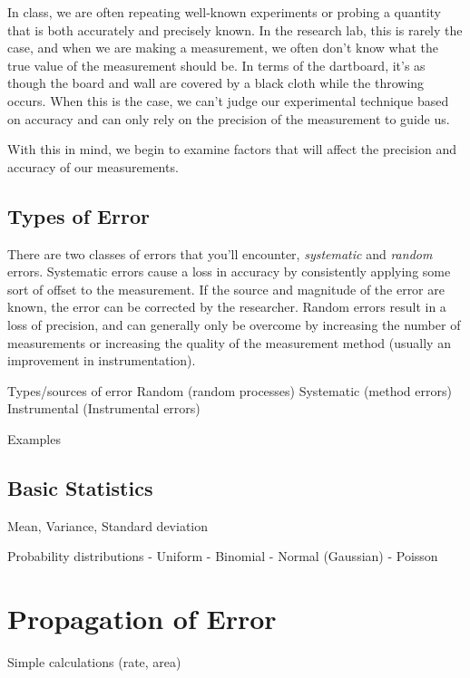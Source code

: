 \documentclass[nobib,nofonts,nols,nohyper]{tufte-handout}
\begin{document}
In class, we are often repeating well-known experiments or probing a quantity that is both accurately and precisely known. 
In the research lab, this is rarely the case, and when we are making a measurement, we often don't know what the true value of the measurement should be. 
In terms of the dartboard, it's as though the board and wall are covered by a black cloth while the throwing occurs. 
When this is the case, we can't judge our experimental technique based on accuracy and can only rely on the precision of the measurement to guide us. 

With this in mind, we begin to examine factors that will affect the precision and accuracy of our measurements. 


\subsection{Types of Error} %
\label{sub:types_of_error}

There are two classes of errors that you'll encounter, \emph{systematic} and \emph{random} errors. Systematic errors cause a loss in accuracy by consistently applying some sort of offset to the measurement. If the source and magnitude of the error are known, the error can be corrected by the researcher. Random errors result in a loss of precision, and can generally only be overcome by increasing the number of measurements or increasing the quality of the measurement method (usually an improvement in instrumentation). 

Types/sources of error
Random (random processes)
Systematic (method errors)
Instrumental (Instrumental errors)

Examples



\subsection{Basic Statistics} %
\label{sub:basic_statistics}

Mean, 
Variance, 
Standard deviation

Probability distributions
- Uniform
- Binomial
- Normal (Gaussian)
- Poisson



\section{Propagation of Error} %
\label{sec:propagation_of_error}

Simple calculations (rate, area)

\nocite{*}
\printbibliography[category=cited]%

\printbibliography[%
  title={Further Reading},%
  resetnumbers,%
  omitnumbers,%
	notcategory=cited,%
	]
\end{document}
